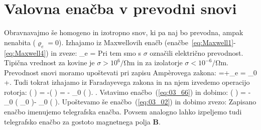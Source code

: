 \section{Valovna enačba v prevodni snovi}
Obravnavajmo še homogeno in izotropno snov, ki pa naj bo prevodna, ampak
nenabita ($\varrho_e = 0$). Izhajamo
iz Maxwellovih enačb (enačbe~\ref{eq:Maxwell1}-\ref{eq:Maxwell4}) in zveze:
\beq
{}_e = \sigma {}
\label{eq:03_65}
\eeq
Pri tem smo s $\sigma$ označili električno prevodnost. Tipična vrednost
za kovine je $\sigma > 10^6/\si{\ohm\m}$ in za izolatorje 
$\sigma < 10^{-6}/\si{\ohm\m}$. 
Prevodnost snovi moramo upoštevati pri zapisu Amp\`{e}rovega zakona:
\beq
\nabla\times{} =+_e = 
\varepsilon \varepsilon_0 +\sigma {}.
\label{eq:03_66}
\eeq
Tudi tokrat izhajamo iz Faradayevega zakona in na njem izvedemo operacijo rotorja:
\beq
\nabla \times \left( \nabla \times  {}\right) = -\nabla\times \left(
\right) = - \mu \mu_0 
\left( \nabla \times {}\right).
\label{eq:03_67}
\eeq.
Vstavimo enačbo~(\ref{eq:03_66}) in dobimo:
\beq
\nabla \times \left( \nabla \times  {}\right) =
 -\mu \mu_0 
\left( \varepsilon \varepsilon_0 \right)-
\mu \mu_0 \left(\sigma {} \right).
\label{eq:03_671}
\eeq
Upoštevamo še enačbo~(\ref{eq:03_02}) in dobimo zvezo:
Zapisano enačbo imenujemo telegrafska enačba. Povsem analogno lahko izpeljemo tudi telegrafsko enačbo
za gostoto magnetnega polja $\mathbf{B}$.

